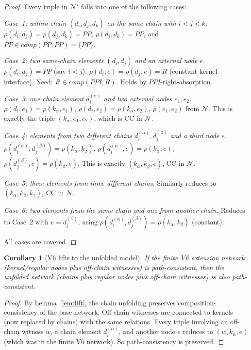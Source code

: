 \documentclass[11pt]{article}
\newcommand{\PP}{\mathit{PP}}
\newcommand{\PPI}{\mathit{PPI}}
\newcommand{\comp}{\mathit{comp}}
\newtheorem{corollary}[theorem]{Corollary}
\theoremstyle{definition}
\begin{document}
\begin{proof}
Every triple in $\mathcal{N}'$ falls into one of the following
cases:

\emph{Case~1: within-chain $(d_i, d_j, d_k)$ on the same chain
with $i < j < k$.}\;
$\rho(d_i, d_j) = \rho(d_j, d_k) = \PP$, $\rho(d_i, d_k) = \PP$,
and $\PP \in \comp(\PP, \PP) = \{\PP\}$.

\emph{Case~2: two same-chain elements $(d_i, d_j)$ and an
external node $e$.}\;
$\rho(d_i, d_j) = \PP$ (say $i < j$),
$\rho(d_i, e) = \rho(d_j, e) = R$ (constant kernel interface).
Need: $R \in \comp(\PPI, R)$.  Holds by $\PPI$-right-absorption.

\emph{Case~3: one chain element $d_i^{(\alpha)}$ and two
external nodes $e_1, e_2$.}\;
$\rho(d_i, e_1) = \rho(k_\alpha, e_1)$,
$\rho(d_i, e_2) = \rho(k_\alpha, e_2)$,
$\rho(e_1, e_2)$ from $\mathcal{N}$.
This is exactly the triple $(k_\alpha, e_1, e_2)$, which is
CC in $\mathcal{N}$.

\emph{Case~4: elements from two different chains
$d_i^{(\alpha)}, d_j^{(\beta)}$ and a third node $e$.}\;
$\rho(d_i^{(\alpha)}, d_j^{(\beta)}) = \rho(k_\alpha, k_\beta)$,
$\rho(d_i^{(\alpha)}, e) = \rho(k_\alpha, e)$,
$\rho(d_j^{(\beta)}, e) = \rho(k_\beta, e)$.
This is exactly $(k_\alpha, k_\beta, e)$, CC in $\mathcal{N}$.

\emph{Case~5: three elements from three different chains.}\;
Similarly reduces to $(k_\alpha, k_\beta, k_\gamma)$, CC in
$\mathcal{N}$.

\emph{Case~6: two elements from the same chain and one from
another chain.}\;
Reduces to Case~2 with $e = d_j^{(\beta)}$, using
$\rho(d_i^{(\alpha)}, d_j^{(\beta)}) = \rho(k_\alpha, k_\beta)$
(constant).

All cases are covered.
\end{proof}

\begin{corollary}[V6 lifts to the unfolded model]
If the finite V6 extension network (kernel/regular nodes plus
off-chain witnesses) is path-consistent, then the unfolded
network (chains plus regular nodes plus off-chain witnesses) is
also path-consistent.
\end{corollary}

\begin{proof}
By Lemma~\ref{lem:lift}, the chain unfolding preserves
composition-consistency of the base network.  Off-chain
witnesses are connected to kernels (now replaced by chains)
with the same relations.  Every triple involving an off-chain
witness $w$, a chain element $d_i^{(\alpha)}$, and another node
$e$ reduces to $(w, k_\alpha, e)$ (which was in the finite V6
network).  So path-consistency is preserved.
\end{proof}
\end{document}
